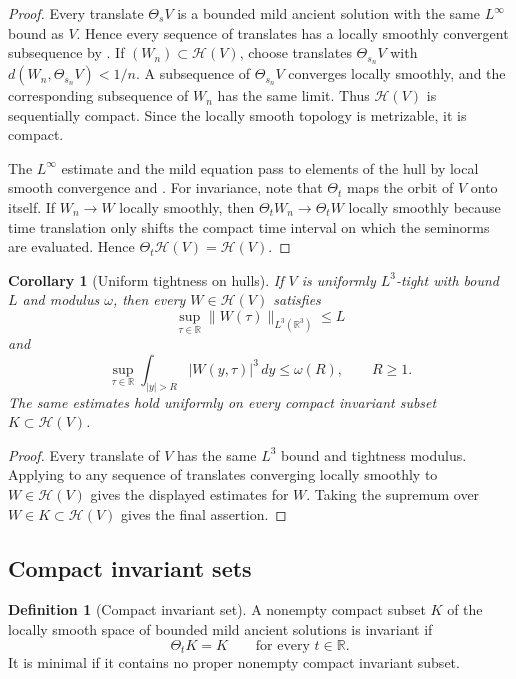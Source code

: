 \documentclass[11pt]{amsart}
\theoremstyle{plain}
\newtheorem{corollary}[theorem]{Corollary}
\theoremstyle{definition}
\newtheorem{definition}[theorem]{Definition}
\theoremstyle{remark}
\numberwithin{equation}{section}
\newcommand{\R}{\mathbb R}
\newcommand{\calH}{\mathcal H}
\begin{document}
\begin{proof}
Every translate \(\Theta_sV\) is a bounded mild ancient solution with the same
\(L^\infty\) bound as \(V\).  Hence every sequence of translates has a
locally smoothly convergent subsequence by .
If \((W_n)\subset\calH(V)\), choose translates \(\Theta_{s_n}V\) with
\(d(W_n,\Theta_{s_n}V)<1/n\).  A subsequence of \(\Theta_{s_n}V\) converges
locally smoothly, and the corresponding subsequence of \(W_n\) has the same
limit.  Thus \(\calH(V)\) is sequentially compact.  Since the locally smooth
topology is metrizable, it is compact.

The \(L^\infty\) estimate and the mild equation pass to elements of the hull
by local smooth convergence and .  For invariance, note
that \(\Theta_t\) maps the orbit of \(V\) onto itself.  If \(W_n\to W\)
locally smoothly, then \(\Theta_tW_n\to\Theta_tW\) locally smoothly because
time translation only shifts the compact time interval on which the
seminorms are evaluated.  Hence \(\Theta_t\calH(V)=\calH(V)\).

\end{proof}

\begin{corollary}[Uniform tightness on hulls]\label{cor:tightness-on-hulls}
If \(V\) is uniformly \(L^3\)-tight with bound \(L\) and modulus \(\omega\),
then every \(W\in\calH(V)\) satisfies
\[
   \sup_{\tau\in\R}\|W(\tau)\|_{L^3(\R^3)}\le L
\]
and
\[
   \sup_{\tau\in\R}\int_{|y|>R}|W(y,\tau)|^3\,dy\le\omega(R),
   \qquad R\ge1.
\]
The same estimates hold uniformly on every compact invariant subset
\(K\subset\calH(V)\).
\end{corollary}

\begin{proof}
Every translate of \(V\) has the same \(L^3\) bound and tightness modulus.
Applying  to any sequence of translates converging
locally smoothly to \(W\in\calH(V)\) gives the displayed estimates for \(W\).
Taking the supremum over \(W\in K\subset\calH(V)\) gives the final assertion.
\end{proof}

\subsection{Compact invariant sets}

\begin{definition}[Compact invariant set]\label{def:compact-invariant}
A nonempty compact subset \(K\) of the locally smooth space of bounded mild
ancient solutions is invariant if
\[
   \Theta_tK=K
   \qquad\text{for every }t\in\R .
\]
It is minimal if it contains no proper nonempty compact invariant subset.
\end{definition}
\end{document}
